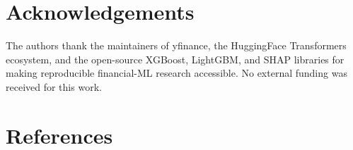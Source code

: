 \documentclass[12pt,a4paper]{article}
\begin{document}
\section{Acknowledgements}

The authors thank the maintainers of yfinance, the HuggingFace Transformers
ecosystem, and the open-source XGBoost, LightGBM, and SHAP libraries for making
reproducible financial-ML research accessible. No external funding was received
for this work.

\section{References}
\end{document}
